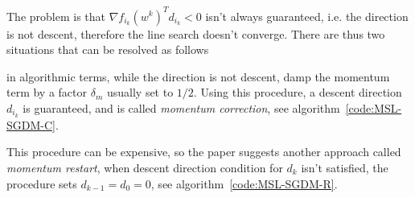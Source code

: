 The problem is that $\nabla f_{i_k}(w^k)^Td_{i_k}<0$ isn't always guaranteed, i.e. the direction is not descent, therefore the line search doesn't converge. There are thus two situations that can be resolved as follows
\begin{center}
\end{center}
in algorithmic terms, while the direction is not descent, damp the momentum term by a factor $\delta_m$ usually set to $1/2$. Using this procedure, a descent direction $d_{i_k}$ is guaranteed, and is called \emph{momentum correction}, see algorithm~\vref{code:MSL-SGDM-C}.

This procedure can be expensive, so the paper suggests another approach called \emph{momentum restart}, when descent direction condition for $d_k$ isn't satisfied, the procedure sets $d_{k-1}=d_0=0$, see algorithm~\vref{code:MSL-SGDM-R}.
